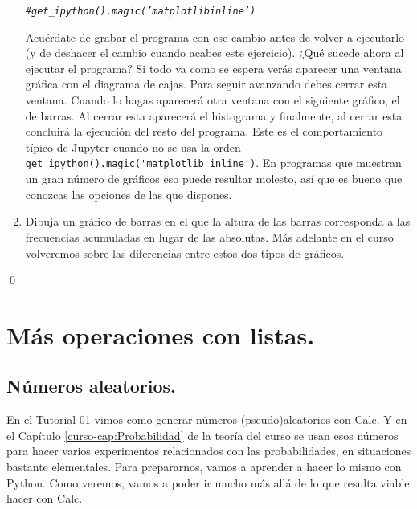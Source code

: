 \documentclass[10pt,a4paper]{article}\usepackage[]{graphicx}\usepackage[]{color}
\makeatletter
\newcommand{\hlcom}[1]{\textcolor[rgb]{0.678,0.584,0.686}{\textit{#1}}}%
\newenvironment{kframe}{%
 \def\at@end@of@kframe{}%
 \ifinner\ifhmode%
  \def\at@end@of@kframe{\end{minipage}}%
  \begin{minipage}{\columnwidth}%
 \fi\fi%
 \def\FrameCommand##1{\hskip\@totalleftmargin \hskip-\fboxsep
 \colorbox{shadecolor}{##1}\hskip-\fboxsep
     \hskip-\linewidth \hskip-\@totalleftmargin \hskip\columnwidth}%
 \MakeFramed {\advance\hsize-\width
   \@totalleftmargin\z@ \linewidth\hsize
   \@setminipage}}%
 {\par\unskip\endMakeFramed%
 \at@end@of@kframe}
\newenvironment{knitrout}{}{} %
\makeatother
\begin{document}
\begin{ejercicio}
\begin{enumerate}
\begin{knitrout}
\begin{kframe}
\begin{alltt}
\hlcom{# get_ipython().magic('matplotlib inline')}
\end{alltt}
\end{kframe}
\end{knitrout}
Acuérdate de grabar el programa con ese cambio antes de volver a ejecutarlo (y de deshacer el cambio cuando acabes este ejercicio). ¿Qué sucede ahora al ejecutar el programa? Si todo va como se espera verás aparecer una ventana gráfica con el diagrama de cajas. Para seguir avanzando debes cerrar esta ventana. Cuando lo hagas aparecerá otra ventana con el siguiente gráfico, el de barras. Al cerrar esta aparecerá el histograma y finalmente, al cerrar esta concluirá la ejecución del resto del programa. Este es el comportamiento típico de Jupyter cuando no se usa la orden \verb& get_ipython().magic('matplotlib inline')&. En programas que muestran un gran número de gráficos eso puede resultar molesto, así que es bueno que conozcas las opciones de las que dispones.
\item Dibuja un gráfico de barras en el que la altura de las barras corresponda a las  frecuencias acumuladas en lugar de las absolutas. Más adelante en el curso volveremos sobre las diferencias entre estos dos tipos de gráficos.
\end{enumerate}
\qed
\end{ejercicio}

\section{Más operaciones con listas.}
\label{tut02:sec:masOperacionesListas}

\subsection{Números aleatorios.}
\label{tut02:subsec:numerosAleatorios}

En el Tutorial-01 vimos como generar números (pseudo)aleatorios con Calc. Y en el Capítulo \ref{curso-cap:Probabilidad} de la teoría del curso se usan esos números para hacer varios experimentos relacionados con las probabilidades, en situaciones bastante elementales. Para prepararnos, vamos a aprender a hacer lo mismo con Python. Como veremos, vamos a poder ir mucho más allá de lo que resulta viable hacer con Calc.
\end{document}
